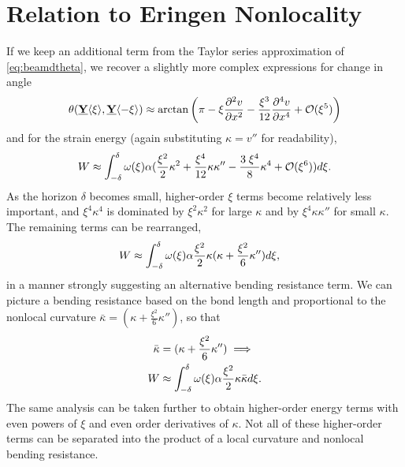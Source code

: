 \documentclass[preprint,review,12pt]{elsarticle}
\newcommand\vstate[3]{%
	\mathbf{\underline{#1}}%
	\ifstrempty{#2}{}{[#2]}%
	\ifstrempty{#3}{}{\langle #3 \rangle}}
\begin{document}
\section{Relation to Eringen Nonlocality}
\label{sec:EringenCompare}
If we keep an additional term from the Taylor series approximation of \cref{eq:beamdtheta}, we recover a slightly more complex expressions for change in angle
%
\begin{equation}
\label{eq:beamdthetaHOT}
\theta(\vstate{Y}{}{\xi},\vstate{Y}{}{\mathbf{-\xi}}) \approx \arctan\left(\pi-\xi \frac{\partial^2 v}{\partial x^2} -\frac{\xi^3}{12} \frac{\partial^4 v}{\partial x^4}  +\mathcal{O}(\xi^5)\right)\notag
\end{equation}
%
and for the strain energy (again substituting \(\kappa = v''\) for readability),
%
%
%
\begin{equation}
W \approx \int_{-\delta}^\delta \omega(\xi)\alpha(\frac{\xi^2}{2}\kappa^2+\frac{\xi^4}{12}\kappa\kappa''-\frac{3\; \xi^4}{8}\kappa^4+\mathcal{O}(\xi^6)) d\xi.\notag
\end{equation}
%
As the horizon \(\delta\) becomes small, higher-order \(\xi\) terms become relatively less important, and \(\xi^4\kappa^4\) is dominated by \(\xi^2\kappa^2\) for large \(\kappa\) and by \(\xi^4\kappa\kappa''\) for small \(\kappa\).
The remaining terms can be rearranged,
\begin{align}
W &\approx \int_{-\delta}^\delta \omega(\xi)\alpha \frac{\xi^2}{2}\kappa(\kappa + \frac{\xi^2}{6}\kappa'') d\xi, \notag
\end{align}
in a manner strongly suggesting an alternative bending resistance term.
We can picture a bending resistance based on the bond length and proportional to the nonlocal curvature  \(\bar{\kappa}=(\kappa + \frac{\xi^2}{6}\kappa'')\), so that 
%
\begin{align}
\label{eq:NLbending}
\bar{\kappa}&=(\kappa + \frac{\xi^2}{6}\kappa'') \implies  \\
W &\approx \int_{-\delta}^\delta \omega(\xi)\alpha \frac{\xi^2}{2}\kappa\bar{\kappa}d\xi .\notag
\end{align}
%  
The same analysis can be taken further to obtain higher-order energy terms with even powers of \(\xi\) and even order derivatives of \(\kappa\). 
Not all of these higher-order terms can be separated into the product of a local curvature and nonlocal bending resistance.
\end{document}

